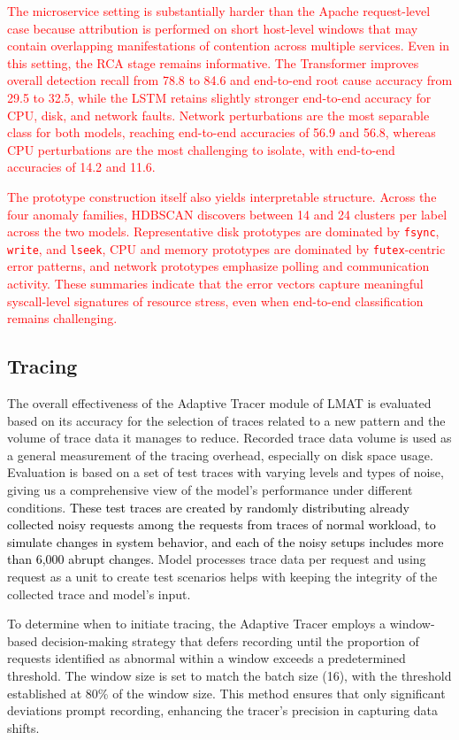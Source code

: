 \documentclass[preprint,12pt]{elsarticle}
\begin{document}
\textcolor{red}{The microservice setting is substantially harder than the Apache request-level case because attribution is performed on short host-level windows that may contain overlapping manifestations of contention across multiple services. Even in this setting, the RCA stage remains informative. The Transformer improves overall detection recall from 78.8 to 84.6 and end-to-end root cause accuracy from 29.5 to 32.5, while the LSTM retains slightly stronger end-to-end accuracy for CPU, disk, and network faults. Network perturbations are the most separable class for both models, reaching end-to-end accuracies of 56.9 and 56.8, whereas CPU perturbations are the most challenging to isolate, with end-to-end accuracies of 14.2 and 11.6.}

\textcolor{red}{The prototype construction itself also yields interpretable structure. Across the four anomaly families, HDBSCAN discovers between 14 and 24 clusters per label across the two models. Representative disk prototypes are dominated by \texttt{fsync}, \texttt{write}, and \texttt{lseek}, CPU and memory prototypes are dominated by \texttt{futex}-centric error patterns, and network prototypes emphasize polling and communication activity. These summaries indicate that the error vectors capture meaningful syscall-level signatures of resource stress, even when end-to-end classification remains challenging.}


\subsection{Tracing}
The overall effectiveness of the Adaptive Tracer module of LMAT is evaluated based on its accuracy for the selection of traces related to a new pattern and the volume of trace data it manages to reduce. Recorded trace data volume is used as a general measurement of the tracing overhead, especially on disk space usage. Evaluation is based on a set of test traces with varying levels and types of noise, giving us a comprehensive view of the model’s performance under different conditions. \textcolor{black}{These test traces are created by randomly distributing already collected noisy requests among the requests from traces of normal workload, to simulate changes in system behavior, and each of the noisy setups includes more than 6,000 abrupt changes.} Model processes trace data per request and using request as a unit to create test scenarios helps with keeping the integrity of the collected trace and model's input.

To determine when to initiate tracing, the Adaptive Tracer employs a window-based decision-making strategy that defers recording until the proportion of requests identified as abnormal within a window exceeds a predetermined threshold. The window size is set to match the batch size (16), with the threshold established at 80\% of the window size. This method ensures that only significant deviations prompt recording, enhancing the tracer's precision in capturing data shifts.
\end{document}
